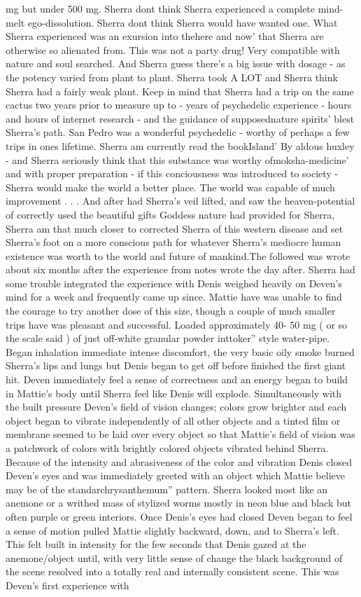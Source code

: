 \documentclass[12pt]{book}
\begin{document}
mg but under 500 mg. Sherra dont think Sherra experienced a complete mind-melt ego-dissolution. Sherra dont think Sherra would have wanted one. What Sherra experienced was an exursion into thehere and now' that Sherra are otherwise so alienated from. This was not a party drug! Very compatible with nature and soul searched. And Sherra guess there's a big issue with dosage - as the potency varied from plant to plant. Sherra took A LOT and Sherra think Sherra had a fairly weak plant. Keep in mind that Sherra had a trip on the same cactus two years prior to measure up to - years of psychedelic experience - hours and hours of internet research - and the guidance of supposednature spirits' blest Sherra's path. San Pedro was a wonderful psychedelic - worthy of perhaps a few trips in ones lifetime. Sherra am currently read the bookIsland' By aldous huxley - and Sherra seriously think that this substance was worthy ofmoksha-medicine' and with proper preparation - if this conciousness was introduced to society - Sherra would make the world a better place. The world was capable of much improvement . . .  And after had Sherra's veil lifted, and saw the heaven-potential of correctly used the beautiful gifts Goddess nature had provided for Sherra, Sherra am that much closer to corrected Sherra of this western disease and set Sherra's foot on a more conscious path for whatever Sherra's mediocre human existence was worth to the world and future of mankind.The followed was wrote about six months after the experience from notes wrote the day after. Sherra had some trouble integrated the experience with Denis weighed heavily on Deven's mind for a week and frequently came up since. Mattie have was unable to find the courage to try another dose of this size, though a couple of much smaller trips have was pleasant and successful. Loaded approximately 40- 50 mg ( or so the scale said ) of just off-white granular powder inttoker'' style water-pipe. Began inhalation immediate intense discomfort, the very basic oily smoke burned Sherra's lips and lungs but Denis began to get off before finished the first giant hit. Deven immediately feel a sense of correctness and an energy began to build in Mattie's body until Sherra feel like Denis will explode. Simultaneously with the built pressure Deven's field of vision changes; colors grow brighter and each object began to vibrate independently of all other objects and a tinted film or membrane seemed to be laid over every object so that Mattie's field of vision was a patchwork of colors with brightly colored objects vibrated behind Sherra. Because of the intensity and abrasiveness of the color and vibration Denis closed Deven's eyes and was immediately greeted with an object which Mattie believe may be of the standarchrysanthemum'' pattern. Sherra looked most like an anemone or a writhed mass of stylized worms mostly in neon blue and black but often purple or green interiors. Once Denis's eyes had closed Deven began to feel a sense of motion pulled Mattie slightly backward, down, and to Sherra's left. This felt built in intensity for the few seconds that Denis gazed at the anemone/object until, with very little sense of change the black background of the scene resolved into a totally real and internally consistent scene. This was Deven's first experience with 
\end{document}
